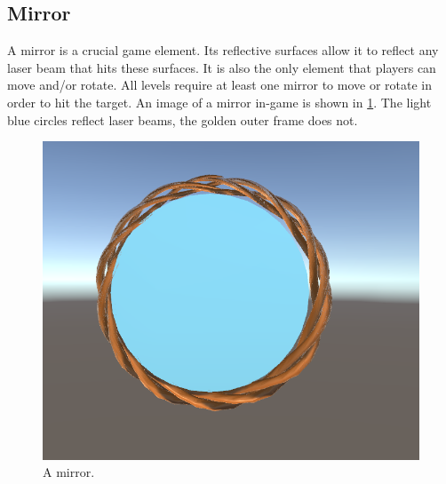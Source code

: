 		\subsection{Mirror} \label{ssec:mirror}
			A mirror is a crucial game element. Its reflective surfaces
			allow it to reflect any laser beam that hits these surfaces.
			It is also the only element that players can move and/or rotate.
			All levels require at least one mirror to move or rotate
			in order to hit the target. An image of a mirror in-game is shown
			in \ref{fig:mirror}. The light blue circles reflect laser beams, 
			the golden outer frame does not.
			\begin{figure}[!ht]
				\centering
				\includegraphics[scale = 0.3]{Mirror}
				\caption{A mirror.}
				\label{fig:mirror}
			\end{figure}
			
